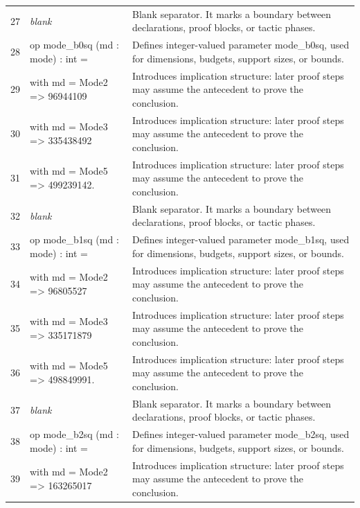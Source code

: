 \documentclass[10pt]{article}
\begin{document}
\begin{longtable}{r L{0.53\textwidth} L{0.37\textwidth}}
27 & {\ttfamily\scriptsize \emph{blank}} & Blank separator.  It marks a boundary between declarations, proof blocks, or tactic phases. \\
28 & {\ttfamily\scriptsize op mode\_b0sq (md : mode) : int =} & Defines integer-valued parameter mode\_b0sq, used for dimensions, budgets, support sizes, or bounds. \\
29 & {\ttfamily\scriptsize   with md = Mode2 => 96944109} & Introduces implication structure: later proof steps may assume the antecedent to prove the conclusion. \\
30 & {\ttfamily\scriptsize   with md = Mode3 => 335438492} & Introduces implication structure: later proof steps may assume the antecedent to prove the conclusion. \\
31 & {\ttfamily\scriptsize   with md = Mode5 => 499239142.} & Introduces implication structure: later proof steps may assume the antecedent to prove the conclusion. \\
32 & {\ttfamily\scriptsize \emph{blank}} & Blank separator.  It marks a boundary between declarations, proof blocks, or tactic phases. \\
33 & {\ttfamily\scriptsize op mode\_b1sq (md : mode) : int =} & Defines integer-valued parameter mode\_b1sq, used for dimensions, budgets, support sizes, or bounds. \\
34 & {\ttfamily\scriptsize   with md = Mode2 => 96805527} & Introduces implication structure: later proof steps may assume the antecedent to prove the conclusion. \\
35 & {\ttfamily\scriptsize   with md = Mode3 => 335171879} & Introduces implication structure: later proof steps may assume the antecedent to prove the conclusion. \\
36 & {\ttfamily\scriptsize   with md = Mode5 => 498849991.} & Introduces implication structure: later proof steps may assume the antecedent to prove the conclusion. \\
37 & {\ttfamily\scriptsize \emph{blank}} & Blank separator.  It marks a boundary between declarations, proof blocks, or tactic phases. \\
38 & {\ttfamily\scriptsize op mode\_b2sq (md : mode) : int =} & Defines integer-valued parameter mode\_b2sq, used for dimensions, budgets, support sizes, or bounds. \\
39 & {\ttfamily\scriptsize   with md = Mode2 => 163265017} & Introduces implication structure: later proof steps may assume the antecedent to prove the conclusion. \\

\end{longtable}
\end{document}

